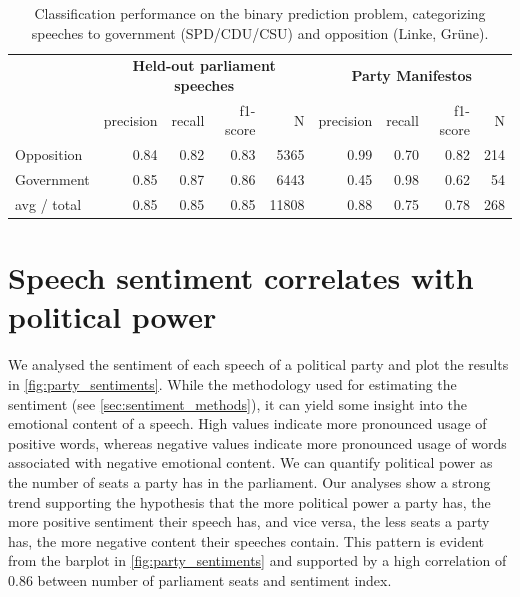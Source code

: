 \documentclass{article} %
\begin{document}
\begin{table}[t]
\begin{center}
\begin{tabular}{lrrrrrrrr}
& \multicolumn{4}{c}{\bf Held-out parliament speeches} & \multicolumn{4}{c}{\bf Party Manifestos}\\
    &         precision    &recall &  f1-score  & N    &         precision    &recall &  f1-score  & N\\
\hline \hline
      Opposition   &  0.84  &    0.82  &    0.83  &    5365 & 0.99   &   0.70    &  0.82    &   214\\
     Government   &    0.85  &    0.87    &  0.86  &    6443 & 0.45    &  0.98  &    0.62  &      54\\
\hline
avg / total    &  0.85  &    0.85  &     0.85    & 11808 & 0.88   &   0.75    &  0.78 &      268\\
%
\end{tabular}
\end{center}
\caption{
\label{tab:results_binary}
Classification performance on the binary prediction problem, categorizing speeches to government (SPD/CDU/CSU) and opposition (Linke, Gr\"une).
}
\end{table}

\section{Speech sentiment correlates with political power}\label{sec:sentiment_result}
We analysed the sentiment of each speech of a political party and plot the results in \autoref{fig:party_sentiments}. While the methodology used for estimating the sentiment (see \autoref{sec:sentiment_methods}), it can yield some insight into the emotional content of a speech. High values indicate more pronounced usage of positive words, whereas negative values indicate more pronounced usage of words associated with negative emotional content. We can quantify political power as the number of seats a party has in the parliament. Our analyses show a strong trend supporting the hypothesis that the more political power a party has, the more positive sentiment their speech has, and vice versa, the less seats a party has, the more negative content their speeches contain. This pattern is evident from the barplot in \autoref{fig:party_sentiments} and supported by a high correlation of 0.86 between number of parliament seats and sentiment index.
\end{document}
